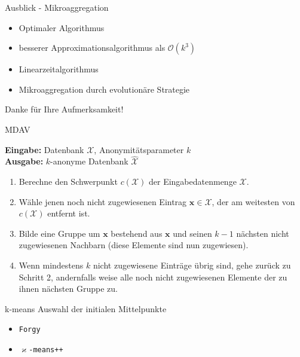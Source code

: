 \documentclass[10pt,table]{beamer}
\newcommand{\kmeansplusplus}{$\varkappa$\texttt{-means++}\xspace}
\newcommand{\mdav}{\texttt{MDAV}\xspace}
\newcommand{\mdavplus}{$\mdav^+$\xspace}
\newcommand{\forgy}{\texttt{Forgy}\xspace}
\begin{document}
\begin{frame}{Ausblick - Mikroaggregation}
    \begin{itemize}
        \item Optimaler Algorithmus
        \item besserer Approximationsalgorithmus als $\mathcal{O}(k^3)$
        \item Linearzeitalgorithmus
        \item Mikroaggregation durch evolutionäre Strategie
    \end{itemize}
\end{frame}

\nocite{*}
\appendix
\begin{frame}
\Large\center
Danke für Ihre Aufmerksamkeit!
\end{frame}

\begin{frame}[noframenumbering]{MDAV}
    \begin{algorithm}[H]
    \renewcommand{\thealgorithm}{}
    \caption{\mdavplus}
    \label{alg:mdavplus}
    {
    \textbf{Eingabe:} Datenbank $\mathcal{X}$, Anonymitätsparameter $k$ \\
    \textbf{Ausgabe:} $k$-anonyme Datenbank $\hat{\mathcal{X}}$
    \begin{enumerate}
        \item Berechne den Schwerpunkt $c(\mathcal{X})$ der Eingabedatenmenge $\mathcal{X}$.
        \item Wähle jenen noch nicht zugewiesenen Eintrag $\mathbf{x} \in \mathcal{X}$, der am weitesten von $c(\mathcal{X})$ entfernt ist.
        \item Bilde eine Gruppe um $\mathbf{x}$ bestehend aus $\mathbf{x}$ und seinen $k-1$ nächsten nicht zugewiesenen Nachbarn (diese Elemente sind nun zugewiesen).
        \item Wenn mindestens $k$ nicht zugewiesene Einträge übrig sind, gehe zurück zu Schritt 2, andernfalls weise alle noch nicht zugewiesenen Elemente der zu ihnen nächsten Gruppe zu.
    \end{enumerate}\vspace*{0.1cm}
    }
    \end{algorithm}
\end{frame}

\begin{frame}[noframenumbering]{k-means}
    Auswahl der initialen Mittelpunkte
    \begin{itemize}
        \item \forgy
        \item \kmeansplusplus
    \end{itemize}
\end{frame}
\end{document}
